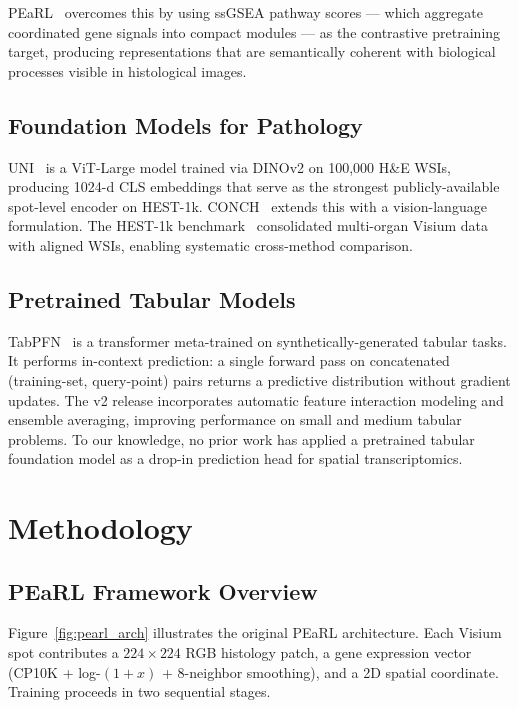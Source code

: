 \documentclass[conference]{IEEEtran}
\begin{document}
PEaRL~\cite{pearl2025} overcomes this by using ssGSEA pathway scores ---
which aggregate coordinated gene signals into compact modules --- as the
contrastive pretraining target, producing representations that are semantically
coherent with biological processes visible in histological images.

\subsection{Foundation Models for Pathology}

UNI~\cite{uni2024} is a ViT-Large model trained via DINOv2 on 100{,}000 H\&E
WSIs, producing 1024-d CLS embeddings that serve as the strongest
publicly-available spot-level encoder on HEST-1k.
CONCH~\cite{conch2024} extends this with a vision-language formulation.
The HEST-1k benchmark~\cite{hest1k} consolidated multi-organ Visium data with
aligned WSIs, enabling systematic cross-method comparison.

\subsection{Pretrained Tabular Models}

TabPFN~\cite{tabpfn2023} is a transformer meta-trained on synthetically-generated
tabular tasks. It performs in-context prediction: a single forward pass on
concatenated (training-set, query-point) pairs returns a predictive distribution
without gradient updates.
The v2 release incorporates automatic feature interaction modeling and ensemble
averaging, improving performance on small and medium tabular problems.
To our knowledge, no prior work has applied a pretrained tabular foundation
model as a drop-in prediction head for spatial transcriptomics.

\section{Methodology}
\label{sec:method}

\subsection{PEaRL Framework Overview}

Figure~\ref{fig:pearl_arch} illustrates the original PEaRL architecture.
Each Visium spot contributes a $224\!\times\!224$ RGB histology patch, a
gene expression vector (CP10K + log-$(1{+}x)$ + 8-neighbor smoothing),
and a 2D spatial coordinate.
Training proceeds in two sequential stages.
\end{document}
